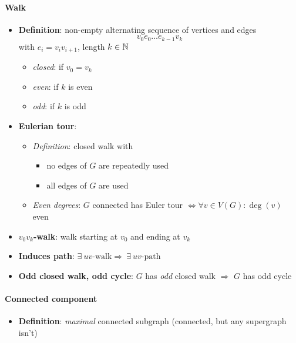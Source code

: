 \paragraph{Walk}
\begin{itemize}
  \item \textbf{Definition}: non-empty alternating sequence of vertices and edges
    \begin{equation*}
      v_0e_0\dots e_{k-1}v_k
    \end{equation*}
    with $ e_i = v_iv_{i+1} $, length $ k \in \mathbb{N} $
    \begin{itemize}
      \item \emph{closed}: if $ v_0=v_k $
      \item \emph{even}: if $ k $ is even
      \item \emph{odd}: if $ k $ is odd
    \end{itemize}
  \item \textbf{Eulerian tour}:
  \begin{itemize}
    \item \emph{Definition}: closed walk with
    \begin{itemize}
      \item no edges of $ G $ are repeatedly used
      \item all edges of $ G $ are used 
    \end{itemize}
    \item \emph{Even degrees}: $ G $ connected has Euler tour $ \Leftrightarrow \forall v \in V(G) : \deg(v) $ even
  \end{itemize}
  \item \textbf{$ v_0v_k $-walk}: walk starting at $ v_0 $ and ending at $ v_k $
  \item \textbf{Induces path}: $ \exists \ uv\text{-walk} \Rightarrow \ \exists \ uv\text{-path} $
  \item \textbf{Odd closed walk, odd cycle}: $ G $  has \emph{odd} closed walk $ \Rightarrow $ $ G $ has odd cycle
\end{itemize}

\paragraph{Connected component}
\begin{itemize}
  \item \textbf{Definition}: \emph{maximal} connected subgraph (connected, but any supergraph isn't)
\end{itemize}

